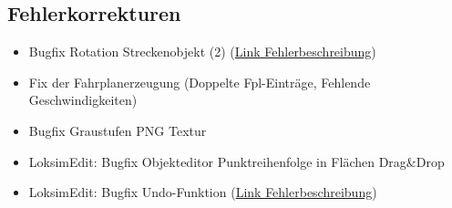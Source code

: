 \subsection{Fehlerkorrekturen}
\begin{itemize}
    \item Bugfix Rotation Streckenobjekt (2) (\href{https://www.loksimulatoren.de/forum/index.php?thread/8492-verschiebung-einzelner-objekte-innerhalb-gedrehter-streckenobjekte-werden-nicht/}{Link Fehlerbeschreibung})
    \item Fix der Fahrplanerzeugung (Doppelte Fpl-Einträge, Fehlende Geschwindigkeiten)
    \item Bugfix Graustufen PNG Textur
    \item LoksimEdit: Bugfix Objekteditor Punktreihenfolge in Flächen Drag&Drop
    \item LoksimEdit: Bugfix Undo-Funktion (\href{https://www.loksimulatoren.de/forum/thread/8485-lastgeregelter-motorsound/}{Link Fehlerbeschreibung})
\end{itemize}
